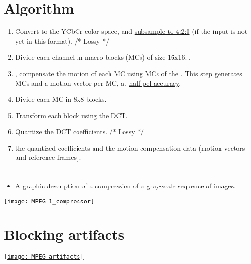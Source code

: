 \section{Algorithm}
\label{sec:MPEG-1_algo}
\begin{enumerate}
\item Convert to the \gls{YCbCr} color space, and
  \href{https://en.wikipedia.org/wiki/Chroma_subsampling}{subsample to
    4:2:0} (if the input is not yet in this format). /* Lossy */
\item Divide each channel in macro-blocks (MCs) of size 16x16. .
\item {},
  \href{https://en.wikipedia.org/wiki/Motion_compensation#Block_motion_compensation}{compensate
    the motion of each MC} using MCs of the . This step generates
   MCs and a motion vector per MC, at
  \href{https://en.wikipedia.org/wiki/Motion_compensation}{half-pel
    accuracy}.
\item Divide each MC in 8x8 blocks.
\item Transform each block using the \gls{DCT}.
\item Quantize the \gls{DCT} coefficients. /* Lossy */
\item {} the quantized coefficients and the motion compensation
  data (motion vectors and reference frames).
\end{enumerate}

\section*{}
\begin{itemize}
\item A graphic description of a compression of a gray-scale sequence of images.
\end{itemize}
\vspace{-2ex}
\begin{center}
  \href{https://w3.ual.es/~vruiz/Docencia/Apuntes/Coding/Video/02-MPEG1/index.html}{\texttt{[image: MPEG-1\_compressor]}}
\end{center}

\section{Blocking artifacts}
\begin{center}
  \href{https://filmora.wondershare.com/video-editing/video-compression-artifacts.html}{\texttt{[image: MPEG\_artifacts]}}
\end{center}
